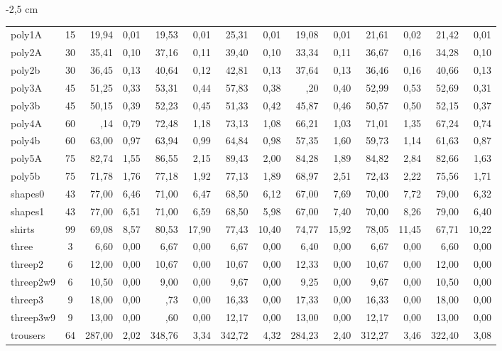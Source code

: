\begin{adjustwidth}{-2 cm}{-2,5 cm}
\begin{threeparttable}
{\begin{tabular}{|l|c|rr|rr|rr|rr|rr|rr|}
            poly1A &15  &19,94 &0,01  &19,53 &0,01  &25,31 &0,01  &19,08 &0,01  &21,61 &0,02  &21,42 &0,01 \\
            poly2A &30  &35,41 &0,10  &37,16 &0,11  &39,40 &0,10  &33,34 &0,11  &36,67 &0,16  &34,28 &0,10 \\
            poly2b &30  &36,45 &0,13  &40,64 &0,12  &42,81 &0,13  &37,64 &0,13  &36,46 &0,16  &40,66 &0,13 \\
            poly3A &45  &51,25 &0,33  &53,31 &0,44  &57,83 &0,38  &\lgray49,20 &0,40  &52,99 &0,53  &52,69 &0,31 \\
            poly3b &45  &50,15 &0,39  &52,23 &0,45  &51,33 &0,42  &45,87 &0,46  &50,57 &0,50  &52,15 &0,37 \\
            poly4A &60  &\lgray66,14 &0,79  &72,48 &1,18  &73,13 &1,08  &66,21 &1,03  &71,01 &1,35  &67,24 &0,74 \\
            poly4b &60  &63,00 &0,97  &63,94 &0,99  &64,84 &0,98  &57,35 &1,60  &59,73 &1,14  &61,63 &0,87 \\
            poly5A &75  &82,74 &1,55  &86,55 &2,15  &89,43 &2,00  &84,28 &1,89  &84,82 &2,84  &82,66 &1,63 \\
            poly5b &75  &71,78 &1,76  &77,18 &1,92  &77,13 &1,89  &68,97 &2,51  &72,43 &2,22  &75,56 &1,71 \\
            shapes0 &43  &77,00 &6,46  &71,00 &6,47  &68,50 &6,12  &67,00 &7,69  &70,00 &7,72  &79,00 &6,32 \\
            shapes1 &43  &77,00 &6,51  &71,00 &6,59  &68,50 &5,98  &67,00 &7,40  &70,00 &8,26  &79,00 &6,40 \\
            shirts &99  &69,08 &8,57  &80,53 &17,90  &77,43 &10,40  &74,77 &15,92  &78,05 &11,45  &67,71 &10,22 \\
            three &3  &6,60 &0,00  &6,67 &0,00  &6,67 &0,00  &6,40 &0,00  &6,67 &0,00  &6,60 &0,00 \\
            threep2 &6  &12,00 &0,00  &10,67 &0,00  &10,67 &0,00  &12,33 &0,00  &10,67 &0,00  &12,00 &0,00 \\
            threep2w9 &6  &10,50 &0,00  &9,00 &0,00  &9,67 &0,00  &9,25 &0,00  &9,67 &0,00  &10,50 &0,00 \\
            threep3 &9  &18,00 &0,00  &\lgray15,73 &0,00  &16,33 &0,00  &17,33 &0,00  &16,33 &0,00  &18,00 &0,00 \\
            threep3w9 &9  &13,00 &0,00  &\lgray11,60 &0,00  &12,17 &0,00  &13,00 &0,00  &12,17 &0,00  &13,00 &0,00 \\
            trousers &64  &287,00 &2,02  &348,76 &3,34  &342,72 &4,32  &284,23 &2,40  &312,27 &3,46  &322,40 &3,08 \\
            \hline
        \end{tabular}
    }
    \label{tab:t2}
\end{threeparttable}\end{adjustwidth}





